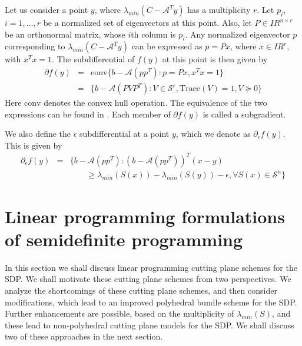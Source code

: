 \documentclass[12pt]{kluwer}
\newcommand{\real}{I\!\! R}
\begin{document}
\begin{article}
Let us consider a point $y$, where $\lambda_{min}(C-\mathcal{A}^Ty)$ has a multiplicity $r$.
Let $p_i$, $i=1,\ldots,r$ be a normalized set of eigenvectors at this point. 
Also, let $P \in \real^{n \times r}$ be an orthonormal matrix, whose $i$th column
is $p_i$. Any normalized eigenvector $p$ corresponding to $\lambda_{min}(C-\mathcal{A}^Ty)$
can be expressed as $p = Px$, where $x \in \real^r$, with $x^Tx = 1$.
The subdifferential of $f(y)$ at this point is then given by
\begin{equation}
\label{subdiff_for_f}
\begin{array}{rcl}
\partial f(y) & = & \mbox{conv}\{ b-\mathcal{A}(pp^T) : p = Px, x^Tx = 1 \} \\
& = & \{ b - \mathcal{A}(PVP^T) : V \in \mathcal{S}^r, \mbox{Trace}(V) = 1, V \succeq 0\}
\end{array}
\end{equation}
Here $\mbox{conv}$ denotes the convex hull operation.
The equivalence of the two expressions can be found in .
Each member of $\partial f(y)$ is called a subgradient.

We also define the $\epsilon$ subdifferential at a point $y$, which we denote as $\partial_{\epsilon} f(y)$.
This is given by
\begin{equation}
\label{epsilon_subdifferential}
\begin{array}{rcl}
\partial_{\epsilon} f(y) & = & \{b - \mathcal{A}(pp^T) :
(b - \mathcal{A}(pp^T))^T(x-y)  \\
&& \qquad \ge \lambda_{min}(S(x)) - \lambda_{min}(S(y)) - \epsilon, 
\forall S(x) \in \mathcal{S}^n \}
\end{array}
\end{equation}

\section{Linear programming formulations \\ of semidefinite programming}

\label{lp_formulations_of_sdp}
In this section we shall discuss linear programming cutting plane schemes for the SDP. We shall motivate these cutting
plane schemes from two perspectives. We analyze the shortcomings of these cutting plane schemes,
and then consider modifications, which lead to an improved polyhedral bundle scheme for the SDP. Further enhancements
are possible, based on the multiplicity of $\lambda_{min}(S)$, and these lead to non-polyhedral cutting plane models
for the SDP. We shall discuss two of these approaches in the next section.


\end{article}
\end{document}

